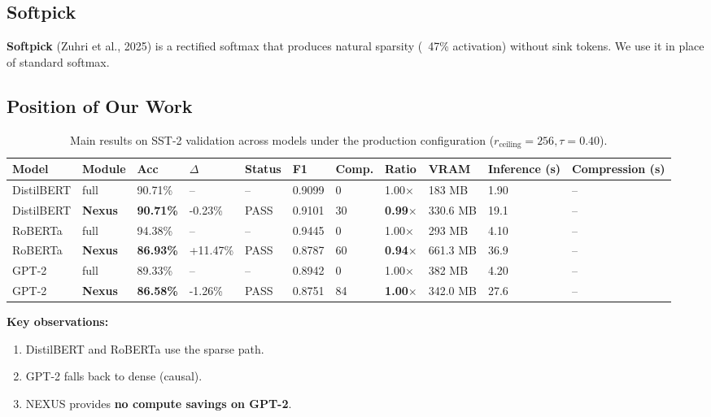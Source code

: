 \subsection{Softpick}

\textbf{Softpick} (Zuhri et al., 2025) is a rectified softmax that produces 
natural sparsity (~47\% activation) without sink tokens. We use it in place 
of standard softmax.

\subsection{Position of Our Work}

\begin{table}[t]
\centering
\small
\begin{tabular}{lllllllllll}
\toprule
\textbf{Model} & \textbf{Module} & \textbf{Acc} & \textbf{$\Delta$} & \textbf{Status} & \textbf{F1} & \textbf{Comp.} & \textbf{Ratio} & \textbf{VRAM} & \textbf{Inference (s)} & \textbf{Compression (s)} \\
\midrule
DistilBERT & full & 90.71\% & -- & -- & 0.9099 & 0 & 1.00$\times$ & 183 MB & 1.90 & -- \\
DistilBERT & \textbf{Nexus} & \textbf{90.71\%} & -0.23\% & PASS & 0.9101 & 30 & \textbf{0.99$\times$} & 330.6 MB & 19.1 & -- \\
RoBERTa & full & 94.38\% & -- & -- & 0.9445 & 0 & 1.00$\times$ & 293 MB & 4.10 & -- \\
RoBERTa & \textbf{Nexus} & \textbf{86.93\%} & +11.47\% & PASS & 0.8787 & 60 & \textbf{0.94$\times$} & 661.3 MB & 36.9 & -- \\
GPT-2 & full & 89.33\% & -- & -- & 0.8942 & 0 & 1.00$\times$ & 382 MB & 4.20 & -- \\
GPT-2 & \textbf{Nexus} & \textbf{86.58\%} & -1.26\% & PASS & 0.8751 & 84 & \textbf{1.00$\times$} & 342.0 MB & 27.6 & -- \\
\bottomrule
\end{tabular}
\caption{Main results on SST-2 validation across models under the production configuration ($r_{\mathrm{ceiling}}=256, \tau=0.40$).}
\label{tab:main_sst2}
\end{table}

\textbf{Key observations:}

\begin{enumerate}
\item DistilBERT and RoBERTa use the sparse path.
\item GPT-2 falls back to dense (causal).
\item NEXUS provides \textbf{no compute savings on GPT-2}.

\end{enumerate}
